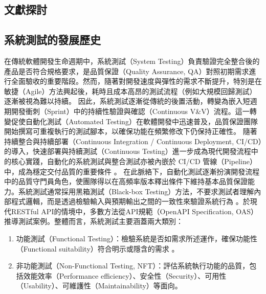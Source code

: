 \begin{ZhChapter}

\chapter{文獻探討}

\section{系統測試的發展歷史}

\text 在傳統軟體開發生命週期中，系統測試（System Testing）負責驗證完全整合後的產品是否符合規格要求，是品質保證（Quality Assurance, QA）對照初期需求進行全面驗收的重要階段。然而，隨著對開發速度與彈性的需求不斷提升，特別是在敏捷（Agile）方法興起後，耗時且成本高昂的測試流程（例如大規模回歸測試）逐漸被視為難以持續。
\text 因此，系統測試逐漸從傳統的後置活動，轉變為嵌入短週期開發衝刺（Sprint）中的持續性驗證與確認（Continuous V\&V）流程。這一轉變促使自動化測試（Automated Testing）在軟體開發中迅速普及，品質保證團隊開始撰寫可重複執行的測試腳本，以確保功能在頻繁修改下仍保持正確性。
\text 隨著持續整合與持續部署（Continuous Integration / Continuous Deployment, CI/CD）的導入，快速部署與持續測試（Continuous Testing）進一步成為現代開發流程中的核心實踐，自動化的系統測試與整合測試亦被內嵌於 CI/CD 管線（Pipeline）中，成為穩定交付品質的重要條件 \parencite{TestingSoftwareSystems}。
\text 在此脈絡下，自動化測試逐漸扮演開發流程中的品質守門員角色，使團隊得以在高頻率版本釋出條件下維持基本品質保證能力。系統測試通常採用黑箱測試（Black-box Testing）方法，不要求測試者理解內部程式邏輯，而是透過檢驗輸入與預期輸出之間的一致性來驗證系統行為 \parencite{Nguyen2024KAT, OracleProblemSurvey}。於現代RESTful API的情境中，多數方法從API規範（OpenAPI Specification, OAS）推導測試案例。整體而言，系統測試主要涵蓋兩大類別：
\begin{enumerate}
    \item 功能測試（Functional Testing）：檢驗系統是否如需求所述運作，確保功能性（Functional suitability）符合明示或隱含的需求 \parencite{TestingSoftwareSystems}。
    \item 非功能測試（Non-Functional Testing, NFT）：評估系統執行功能的品質，包括效能效率（Performance efficiency）、安全性（Security）、可用性（Usability）、可維護性（Maintainability）等面向。
\end{enumerate}


\end{ZhChapter}
